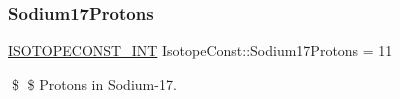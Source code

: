\subsubsection{\texorpdfstring{Sodium17\+Protons}{Sodium17Protons}}
{\footnotesize\ttfamily \mbox{\hyperlink{group___isotope_const-_macros_ga5f18360b3e99483a35c32d789e62621c}{I\+S\+O\+T\+O\+P\+E\+C\+O\+N\+S\+T\+\_\+\+I\+NT}} Isotope\+Const\+::\+Sodium17\+Protons = 11}

\$ \$ Protons in Sodium-\/17. 